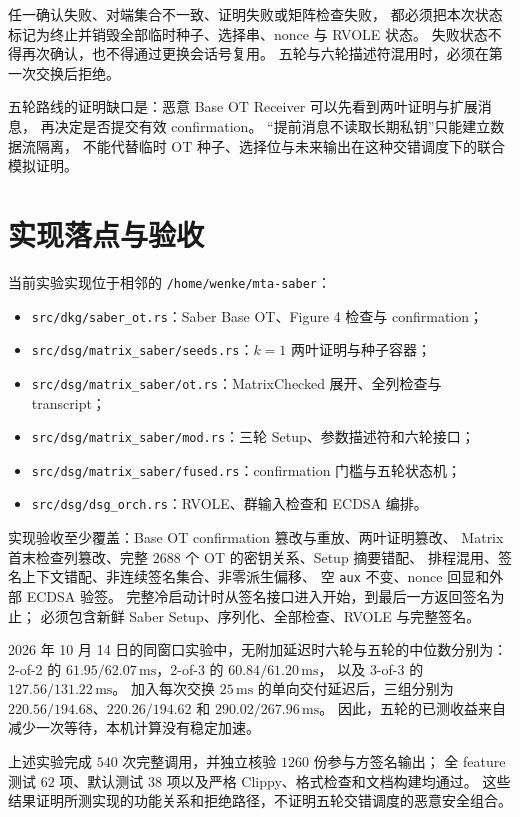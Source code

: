任一确认失败、对端集合不一致、证明失败或矩阵检查失败，
都必须把本次状态标记为终止并销毁全部临时种子、选择串、nonce 与 RVOLE 状态。
失败状态不得再次确认，也不得通过更换会话号复用。
五轮与六轮描述符混用时，必须在第一次交换后拒绝。

五轮路线的证明缺口是：恶意 Base OT Receiver 可以先看到两叶证明与扩展消息，
再决定是否提交有效 confirmation。
“提前消息不读取长期私钥”只能建立数据流隔离，
不能代替临时 OT 种子、选择位与未来输出在这种交错调度下的联合模拟证明。

\section{实现落点与验收}

当前实验实现位于相邻的 \texttt{/home/wenke/mta-saber}：
\begin{itemize}
  \item \texttt{src/dkg/saber\_ot.rs}：Saber Base OT、Figure 4 检查与 confirmation；
  \item \texttt{src/dsg/matrix\_saber/seeds.rs}：$k=1$ 两叶证明与种子容器；
  \item \texttt{src/dsg/matrix\_saber/ot.rs}：MatrixChecked 展开、全列检查与 transcript；
  \item \texttt{src/dsg/matrix\_saber/mod.rs}：三轮 Setup、参数描述符和六轮接口；
  \item \texttt{src/dsg/matrix\_saber/fused.rs}：confirmation 门槛与五轮状态机；
  \item \texttt{src/dsg/dsg\_orch.rs}：RVOLE、群输入检查和 ECDSA 编排。
\end{itemize}

实现验收至少覆盖：Base OT confirmation 篡改与重放、两叶证明篡改、
Matrix 首末检查列篡改、完整 $2688$ 个 OT 的密钥关系、Setup 摘要错配、
排程混用、签名上下文错配、非连续签名集合、非零派生偏移、
空 \texttt{aux} 不变、nonce 回显和外部 ECDSA 验签。
完整冷启动计时从签名接口进入开始，到最后一方返回签名为止；
必须包含新鲜 Saber Setup、序列化、全部检查、RVOLE 与完整签名。

2026 年 10 月 14 日的同窗口实验中，无附加延迟时六轮与五轮的中位数分别为：
2-of-2 的 $61.95/62.07\,\mathrm{ms}$，2-of-3 的 $60.84/61.20\,\mathrm{ms}$，
以及 3-of-3 的 $127.56/131.22\,\mathrm{ms}$。
加入每次交换 $25\,\mathrm{ms}$ 的单向交付延迟后，三组分别为
$220.56/194.68$、$220.26/194.62$ 和 $290.02/267.96\,\mathrm{ms}$。
因此，五轮的已测收益来自减少一次等待，本机计算没有稳定加速。

上述实验完成 $540$ 次完整调用，并独立核验 $1260$ 份参与方签名输出；
全 feature 测试 $62$ 项、默认测试 $38$ 项以及严格 Clippy、格式检查和文档构建均通过。
这些结果证明所测实现的功能关系和拒绝路径，不证明五轮交错调度的恶意安全组合。



